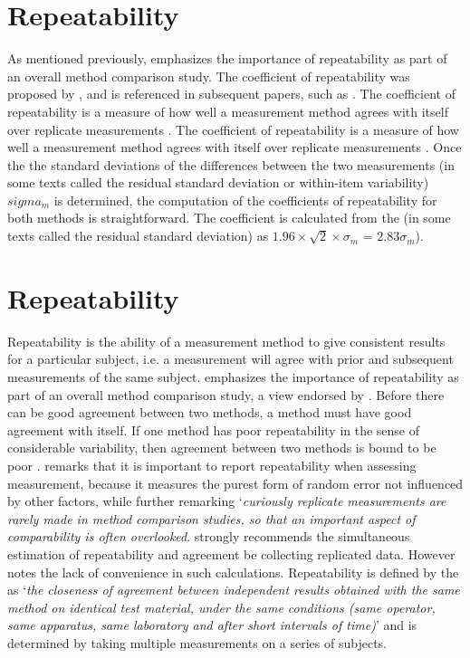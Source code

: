 \documentclass[12pt, a4paper]{report}
\theoremstyle{plain}
\theoremstyle{definition}
\theoremstyle{remark}
\begin{document}
	
	

	



	\section{Repeatability}
	As mentioned previously, \citet{Barnhart} emphasizes the importance of repeatability as part of an overall method comparison study. The coefficient of repeatability was proposed by \citet{BA99}, and is referenced in subsequent papers, such as \citet{BXC2008}. The coefficient of repeatability is a measure of how well a
	measurement method agrees with itself over replicate measurements
	\citep{BA99}. The coefficient of repeatability is a measure of how well a
	measurement method agrees with itself over replicate measurements
	\citep{BA99}. Once the the standard deviations of the differences between the two measurements (in some texts called the residual standard deviation or within-item variability) $sigma_m$ is determined, the
	computation of the coefficients of repeatability for both methods
	is straightforward. The coefficient is calculated from the (in some texts called the residual standard deviation) as  $1.96 \times \sqrt{2} \times \sigma_m$ = $2.83 \sigma_m$).
	
		\section{Repeatability}
		Repeatability is the ability of a measurement method to give consistent results for a particular subject, i.e. a measurement will agree with prior and subsequent measurements of the same subject. \citet{Barnhart} emphasizes the importance of repeatability as part of an overall method comparison study, a view endorsed by \citet{BXC2008}. Before there can be good agreement between two methods, a method must have good agreement with itself. If one method has poor repeatability in the sense of considerable
		variability, then agreement between two methods is bound to be
		poor \citep{ARoy2009}. \citet{Barnhart} remarks that it is important to report repeatability when assessing
		measurement, because it measures the purest form of random error
		not influenced by other factors, while further remarking `\textit{curiously replicate measurements are rarely made in method comparison studies, so that an important aspect of comparability is often overlooked}. \citet{BA99} strongly recommends the simultaneous estimation of repeatability and agreement be collecting replicated data.
		However \citet{ARoy2009} notes the lack of convenience in such calculations. 	Repeatability is defined by the \citet{IUPAC} as `\textit{the closeness of agreement between independent results obtained with the same method on identical test material, under the same conditions (same
			operator, same apparatus, same laboratory and after short intervals of time)}'  and is determined by taking multiple measurements on a series of subjects.
		
\end{document}
